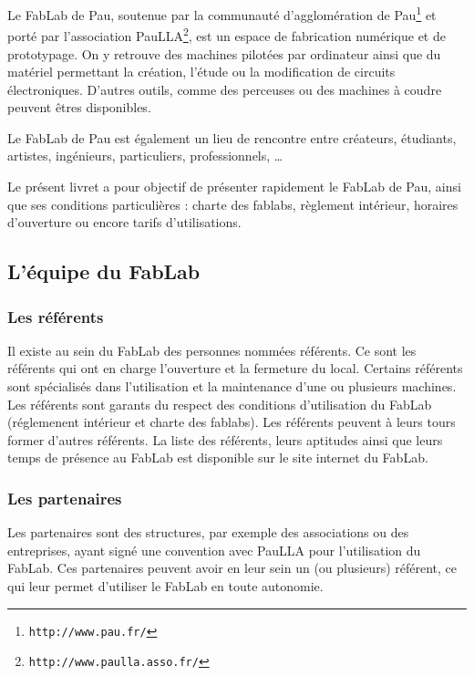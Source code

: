 Le FabLab de Pau, soutenue par la communauté d'agglomération de Pau\footnote{\texttt{http://www.pau.fr/}} et porté par l'association PauLLA\footnote{\texttt{http://www.paulla.asso.fr/}}, est un espace de fabrication numérique et de prototypage. On y retrouve des machines pilotées par ordinateur ainsi que du matériel permettant la création, l'étude  ou la modification de circuits électroniques. D'autres outils, comme des perceuses ou des machines à coudre peuvent êtres disponibles.

Le FabLab de Pau est également un lieu de rencontre entre créateurs, étudiants, artistes, ingénieurs, particuliers, professionnels, \dots 

Le présent livret a pour objectif de présenter rapidement le FabLab de Pau, ainsi que ses conditions particulières : charte des fablabs, règlement intérieur, horaires d'ouverture ou encore tarifs d'utilisations.


\subsection{L'équipe du FabLab}
\subsubsection{Les référents}
Il existe au sein du FabLab des personnes nommées référents.
Ce sont les référents qui ont en charge l'ouverture et la fermeture du local.
Certains référents sont spécialisés dans l'utilisation et la maintenance d'une ou plusieurs machines.
Les référents sont garants du respect des conditions d'utilisation du FabLab (réglemenent intérieur et charte des fablabs).
Les référents peuvent à leurs tours former d'autres référents.
La liste des référents, leurs aptitudes ainsi que leurs temps de présence au FabLab est disponible sur le site internet du FabLab. %

\subsubsection{Les partenaires}
Les partenaires sont des structures, par exemple des associations ou des entreprises, ayant signé une convention avec PauLLA pour l'utilisation du FabLab.
Ces partenaires peuvent avoir en leur sein un (ou plusieurs) référent, ce qui leur permet d'utiliser le FabLab en toute autonomie.

